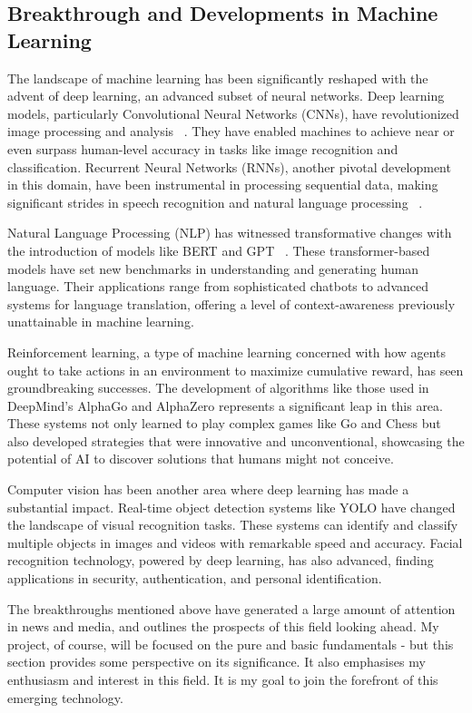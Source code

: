 \documentclass[letterpaper,10pt]{article}
\begin{document}
\subsection{Breakthrough and Developments in Machine Learning}
The landscape of machine learning has been significantly reshaped with the advent of deep learning, an advanced subset of neural networks. Deep learning models, particularly Convolutional Neural Networks (CNNs), have revolutionized image processing and analysis ~\cite{CNNImageClassification}. They have enabled machines to achieve near or even surpass human-level accuracy in tasks like image recognition and classification. Recurrent Neural Networks (RNNs), another pivotal development in this domain, have been instrumental in processing sequential data, making significant strides in speech recognition and natural language processing~\cite{RNNSequentialLearning} .\par
Natural Language Processing (NLP) has witnessed transformative changes with the introduction of models like BERT and GPT ~\cite{BERT_NLP, NLP_Transformer}. These transformer-based models have set new benchmarks in understanding and generating human language. Their applications range from sophisticated chatbots to advanced systems for language translation, offering a level of context-awareness previously unattainable in machine learning. \par
Reinforcement learning, a type of machine learning concerned with how agents ought to take actions in an environment to maximize cumulative reward, has seen groundbreaking successes. The development of algorithms like those used in DeepMind's AlphaGo and AlphaZero represents a significant leap in this area. These systems not only learned to play complex games like Go and Chess but also developed strategies that were innovative and unconventional, showcasing the potential of AI to discover solutions that humans might not conceive. \par
Computer vision has been another area where deep learning has made a substantial impact. Real-time object detection systems like YOLO have changed the landscape of visual recognition tasks. These systems can identify and classify multiple objects in images and videos with remarkable speed and accuracy. Facial recognition technology, powered by deep learning, has also advanced, finding applications in security, authentication, and personal identification. \par
The breakthroughs mentioned above have generated a large amount of attention in news and media, and outlines the prospects of this field looking ahead. My project, of course, will be focused on the pure and basic fundamentals - but this section provides some perspective on its significance. It also emphasises my enthusiasm and interest in this field. It is my goal to join the forefront of this emerging technology.
\end{document}
